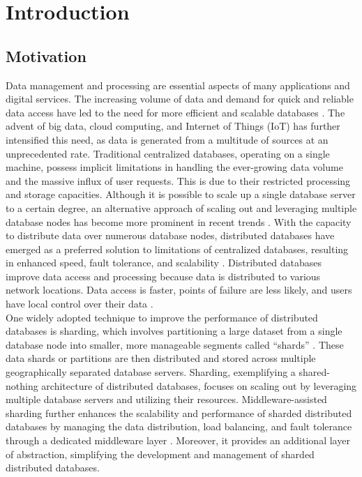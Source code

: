 
\chapter{Introduction}\label{ch:introduction}
\section{Motivation}
\label{sec:background_motivation}
Data management and processing are essential aspects of many applications and digital services. The increasing volume of data and demand for quick and reliable data access have led to the need for more efficient and scalable databases \cite{rahimi2010distributed, ozsu1999principles, darmont2022advances}.  The advent of big data, cloud computing, and Internet of Things (IoT) has further intensified this need, as data is generated from a multitude of sources at an unprecedented rate. Traditional centralized databases, operating on a single machine, possess implicit limitations in handling the ever-growing data volume and the massive influx of user requests. This is due to their restricted processing and storage capacities. Although it is possible to scale up a single database server to a certain degree, an alternative approach of scaling out and leveraging multiple database nodes has become more prominent in recent trends \cite{ozsu1999principles}. With the capacity to distribute data over numerous database nodes, distributed databases have emerged as a preferred solution to limitations of centralized databases, resulting in enhanced speed, fault tolerance, and scalability \cite{silberschatz2011database, tomar2014overview, abdelhafiz2020distributed}. Distributed databases improve data access and processing because data is distributed to various network locations. Data access is faster, points of failure are less likely, and users have local control over their data \cite{abdelhafiz2020distributed}. \\

\noindent One widely adopted technique to improve the performance of distributed databases is sharding, which involves partitioning a large dataset from a single database node into smaller, more manageable segments called ``shards'' \cite{abdelhafiz2021sharding, bagui2015database}. These data shards or partitions are then distributed and stored across multiple geographically separated database servers. Sharding, exemplifying a shared-nothing architecture of distributed databases, focuses on scaling out by leveraging multiple database servers and utilizing their resources. Middleware-assisted sharding further enhances the scalability and performance of sharded distributed databases by managing the data distribution, load balancing, and fault tolerance through a dedicated middleware layer \cite{bernstein1996middleware}.  Moreover, it provides an additional layer of abstraction, simplifying the development and management of sharded distributed databases. \\

